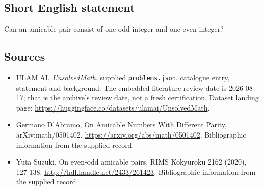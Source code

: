 \documentclass[11pt,a4paper]{article}
\begin{document}
\subsection{Short English statement}

Can an amicable pair consist of one odd integer and one even integer?

\subsection{Sources}

{\small

\begin{itemize}

\item[\hypertarget{source:statement:1}{S1}] ULAM.AI, \emph{UnsolvedMath}, supplied \texttt{problems.json}, catalogue entry, statement and background. The embedded literature-review date is 2026-08-17; that is the archive’s review date, not a fresh certification. Dataset landing page: \url{https://huggingface.co/datasets/ulamai/UnsolvedMath}.

\item[\hypertarget{source:statement:2}{S2}] Germano D'Abramo, On Amicable Numbers With Different Parity, arXiv:math/0501402. \url{https://arxiv.org/abs/math/0501402}. Bibliographic information from the supplied record.

\item[\hypertarget{source:statement:3}{S3}] Yuta Suzuki, On even-odd amicable pairs, RIMS Kokyuroku 2162 (2020), 127-138. \url{http://hdl.handle.net/2433/261423}. Bibliographic information from the supplied record.

\end{itemize}

}

\label{end:statement}
\end{document}
